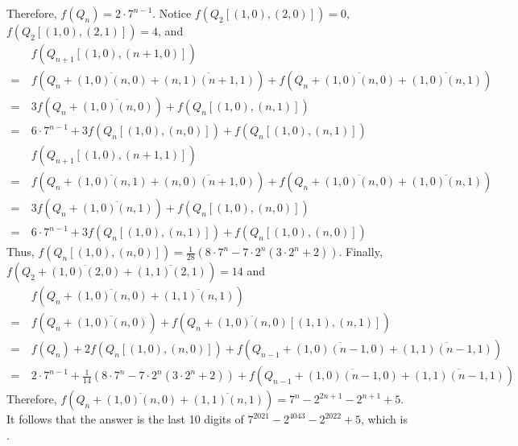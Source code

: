 \begin{solution}
	Therefore, $f(Q_n) = 2\cdot 7^{n-1}$. Notice $f(Q_2[(1,0),(2,0)]) = 0$, $f(Q_2[(1,0),(2,1)]) = 4$, and
	\begin{align*}
	&\ f(Q_{n+1}[(1,0),(n+1,0)])\\
	=&\ f\left(Q_n+\overline{(1,0)(n,0)}+\overline{(n,1)(n+1,1)}\right) + f\left(Q_n+\overline{(1,0)(n,0)}+\overline{(1,0)(n,1)}\right)\\
	=&\ 3f\left(Q_n+\overline{(1,0)(n,0)}\right) + f(Q_n[(1,0),(n,1)])\\
	=&\ 6\cdot 7^{n-1} + 3f(Q_n[(1,0),(n,0)]) + f(Q_n[(1,0),(n,1)])
	\end{align*}
	\begin{align*}
	&\ f(Q_{n+1}[(1,0),(n+1,1)])\\
	=&\ f\left(Q_n+\overline{(1,0)(n,1)}+\overline{(n,0)(n+1,0)}\right) + f\left(Q_n+\overline{(1,0)(n,0)}+\overline{(1,0)(n,1)}\right)\\
	=&\ 3f\left(Q_n+\overline{(1,0)(n,1)}\right) + f(Q_n[(1,0),(n,0)])\\
	=&\ 6\cdot 7^{n-1} + 3f(Q_n[(1,0),(n,1)]) + f(Q_n[(1,0),(n,0)])
	\end{align*}
	Thus, $f(Q_n[(1,0),(n,0)]) = \frac{1}{28} (8\cdot 7^n - 7\cdot 2^n (3\cdot 2^n + 2))$.
	Finally, $f\left(Q_2+\overline{(1,0)(2,0)}+\overline{(1,1)(2,1)}\right) = 14$ and
	\begin{align*}
	&\ f\left(Q_n+\overline{(1,0)(n,0)}+\overline{(1,1)(n,1)}\right)\\
	=&\ f\left(Q_n+\overline{(1,0)(n,0)}\right) + f\left(Q_n+\overline{(1,0)(n,0)}[(1,1),(n,1)]\right)\\
	=&\ f(Q_n) + 2f(Q_n[(1,0),(n,0)]) + f\left(Q_{n-1}+\overline{(1,0)(n-1,0)}+\overline{(1,1)(n-1,1)}\right)\\
	=&\ 2\cdot 7^{n-1} + \frac{1}{14} (8\cdot 7^n - 7\cdot 2^n (3\cdot 2^n + 2)) + f\left(Q_{n-1}+\overline{(1,0)(n-1,0)}+\overline{(1,1)(n-1,1)}\right)
	\end{align*}
	Therefore, $f\left(Q_n+\overline{(1,0)(n,0)}+\overline{(1,1)(n,1)}\right) = 7^n - 2^{2n+1} - 2^{n+1} + 5$. 
	It follows that the answer is the last 10 digits of $7^2021 - 2^{4043} - 2^{2022} + 5$, which is .
\end{solution}\bigskip
